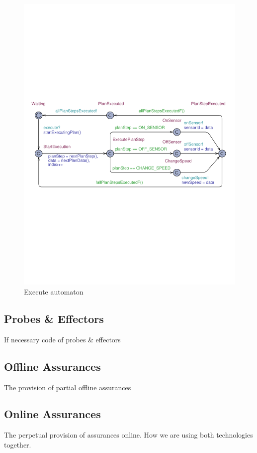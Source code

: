 \begin{figure}[t]
	\centering
	\includegraphics[trim = 10mm 95mm 5mm 105mm, clip, width=\textwidth]{figures/Executor}
	\caption{Execute automaton}\label{fig:execute-automaton}
	
	\vspace*{-2mm}
\end{figure}


\subsection{Probes \& Effectors}
If necessary code of probes \& effectors

\subsection{Offline Assurances}
The provision of partial offline assurances

\subsection{Online Assurances}
The perpetual provision of assurances online. How we are using both technologies together.